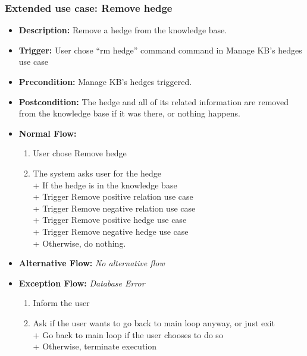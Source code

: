 \documentclass[../gr-final.tex]{subfiles}
\begin{document}
\subsubsection{Extended use case: Remove hedge}
\begin{itemize}
  \item {\bfseries Description:} Remove a hedge from the
    knowledge base. 
  \item {\bfseries Trigger:} User chose ``rm hedge''
    command command in
    Manage KB's hedges use case
  \item {\bfseries Precondition:} Manage KB's hedges triggered.
  \item {\bfseries Postcondition:} The hedge and all of its
    related information are removed from the
    knowledge base if it was there, or nothing happens.
  \item {\bfseries Normal Flow:}
    \begin{enumerate}
      \item User chose Remove hedge 
      \item The system asks user for the hedge\\
        \indent + If the hedge is in the knowledge base\\
        \indent\indent + Trigger Remove positive relation use
        case\\
        \indent\indent + Trigger Remove negative relation use
        case\\
        \indent\indent + Trigger Remove positive hedge use
        case\\
        \indent\indent + Trigger Remove negative hedge use
        case\\
        \indent + Otherwise, do nothing.
    \end{enumerate}
  \item {\bfseries Alternative Flow:} {\em No alternative flow}
  \item {\bfseries Exception Flow:}
    {\em Database Error}
    \begin{enumerate}
      \item Inform the user
      \item Ask if the user wants to go back to main loop anyway,
        or just exit\\
        \indent + Go back to main loop if the user chooses to do
        so\\
        \indent + Otherwise, terminate execution
    \end{enumerate}
\end{itemize}
\end{document}
